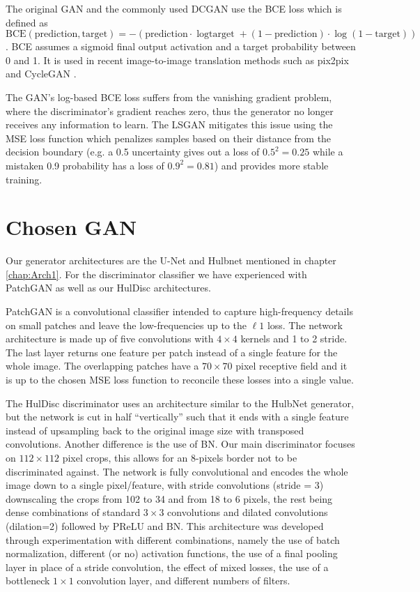 The original \ac{GAN} and the commonly used \ac{DCGAN} use the \ac{BCE} loss which is defined as $\text{BCE}(\text{prediction}, \text{target})=-(\text{prediction}\cdot{\log{\text{target}}}+(1-\text{prediction})\cdot \log{(1-\text{target})})$. \ac{BCE} assumes a sigmoid final output activation and a target probability between 0 and 1. It is used in recent image-to-image translation methods such as pix2pix \cite{pix2pix} and CycleGAN \cite{cyclegan}.

The \ac{GAN}'s log-based \ac{BCE} loss suffers from the vanishing gradient problem, where the discriminator's gradient reaches zero, thus the generator no longer receives any information to learn. The \acf{LSGAN} mitigates this issue using the \acl{MSE} loss function which penalizes samples based on their distance from the decision boundary (e.g. a 0.5 uncertainty gives out a loss of $0.5^2=0.25$ while a mistaken 0.9 probability has a loss of $0.9^2=0.81$) and provides more stable training.

\section{Chosen GAN}\label{sec:HulDisc}

Our generator architectures are the U-Net \cite{unet} and Hulbnet mentioned in chapter \ref{chap:Arch1}. For the discriminator classifier we have experienced with PatchGAN \cite{pix2pix} as well as our HulDisc architectures.

PatchGAN is a convolutional classifier intended to capture high-frequency details on small patches and leave the low-frequencies up to the $\ell 1$ loss. The network architecture is made up of five convolutions with $4 \times 4$ kernels and 1 to 2 stride. The last layer returns one feature per patch instead of a single feature for the whole image. The overlapping patches have a $70 \times 70$ pixel receptive field and it is up to the chosen \ac{MSE} loss function to reconcile these losses into a single value.

The HulDisc discriminator uses an architecture similar to the HulbNet generator, but the network is cut in half ``vertically'' such that it ends with a single feature instead of upsampling back to the original image size with transposed convolutions. Another difference is the use of \acl{BN}. Our main discriminator focuses on $112\times 112$ pixel crops, this allows for an 8-pixels border not to be discriminated against. The network is fully convolutional and encodes the whole image down to a single pixel/feature, with stride convolutions (stride = 3) downscaling the crops from 102 to 34 and from 18 to 6 pixels, the rest being dense combinations of standard $3\times 3$ convolutions and dilated convolutions (dilation=2) followed by \ac{PReLU} and \acl{BN}. This architecture was developed through experimentation with different combinations, namely the use of batch normalization, different (or no) activation functions, the use of a final pooling layer in place of a stride convolution, the effect of mixed losses, the use of a bottleneck $1\times 1$ convolution layer, and different numbers of filters.

